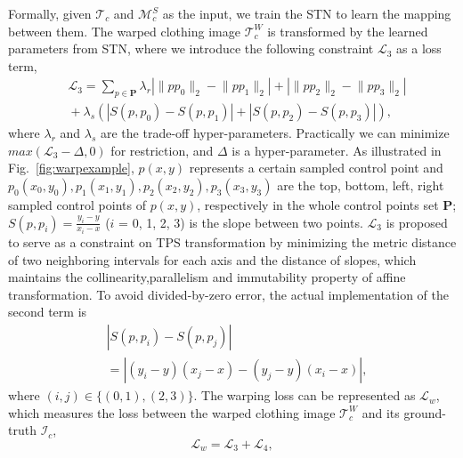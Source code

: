 \documentclass[10pt,twocolumn,letterpaper]{article}
\begin{document}
Formally, given $\mathcal{T}_{c}$ and $\mathcal{M}^{S}_{c}$ as the input, we train the STN to learn the mapping between them. The warped clothing  image $\mathcal{T}^{W}_{c}$ is transformed by the learned parameters from STN, where we introduce the following constraint $\mathcal{L}_{3}$ as a loss term,
\begin{equation}
 \begin{split}
   &\mathcal{L}_{3} \!=\!
   \sum_{p\in\mathbf{P}}\lambda_{r}\left| \lVert pp_0\rVert_2 \!-\! \lVert pp_1\rVert_2 \right| \!+\! \left| \lVert pp_2\rVert_2 \!-\! \lVert pp_3\rVert_2 \right|\\
   & \!+\! \lambda_{s} \left(\left| S\left(p,p_0\right) \!-\! S\left(p,p_1\right) \right| \!+\! \left| S\left(p,p_2\right) \!-\! S\left(p,p_3\right) \right| \right),
    \end{split}
 \end{equation}
 where $\lambda_{r}$ and $\lambda_{s}$ are the trade-off hyper-parameters. Practically we can minimize $max(\mathcal{L}_{3}\!-\!\Delta,0)$ for restriction, and $\Delta$ is a hyper-parameter. As illustrated in Fig.~\ref{fig:warpexample}, $p(x,y)$ represents a certain sampled control point and $p_0(x_0,y_0), p_1(x_1,y_1), p_2(x_2,y_2), p_3(x_3,y_3)$ are the top, bottom, left, right sampled control points of $p(x,y)$, respectively in the whole control points set $\mathbf{P}$; $S\left(p,p_i\right)=\frac{y_i-y}{x_i-x}$ ($i$ = {0, 1, 2, 3}) is the slope between two points.
 $\mathcal{L}_{3}$ is proposed to serve as a constraint on TPS transformation by minimizing the metric distance of two neighboring intervals for each axis and the distance of slopes, which
 maintains the collinearity,parallelism and immutability property of affine transformation. To avoid divided-by-zero error, the actual implementation of the second term is
 \begin{equation}
    \begin{split}
       &| S\left(p,p_i\right)\!-\! S\left(p,p_j\right)|\\
         &=|(y_i-y)(x_j-x)-(y_j-y)(x_i-x)|,
    \end{split}
 \end{equation}
where $(i,j)\in \{(0,1),(2,3)\}$.
The warping loss can be represented as $\mathcal{L}_{w}$, which measures the loss between the warped clothing  image $\mathcal{T}^{W}_{c}$ and its ground-truth $\mathcal{I}_{c}$,
 \begin{equation}
     \mathcal{L}_{w}=\mathcal{L}_{3} + \mathcal{L}_{4},
 \end{equation}
\end{document}
